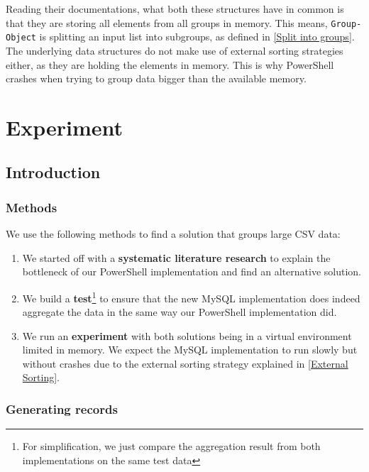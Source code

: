 Reading their documentations, what both these structures have in common
is that they are storing all elements from all groups in memory. This means,
\verb+Group-Object+ is splitting an input list into subgroups,
as defined in \ref{Split into groups}. The underlying data structures
do not make use of external sorting strategies either, as they are
holding the elements in memory. This is why PowerShell crashes when
trying to group data bigger than the available memory.

\newpage

\section{Experiment}

\subsection{Introduction}

\subsubsection{Methods}

We use the following methods to find a solution that groups large CSV data:

\begin{enumerate}
    \item We started off with a \textbf{systematic literature research}
        to explain the bottleneck of our PowerShell implementation
        and find an alternative solution.
    \item We build a \textbf{test}\footnote{For simplification,
        we just compare the aggregation result from both
        implementations on the same test data} to ensure that the new
        MySQL implementation does indeed aggregate the data in the same way
        our PowerShell implementation did.
    \item We run an \textbf{experiment} with both solutions being in a virtual
        environment limited in memory. We expect the MySQL implementation
        to run slowly but without crashes due to the external sorting
        strategy explained in \ref{External Sorting}.
\end{enumerate}

\subsubsection{Generating records}

